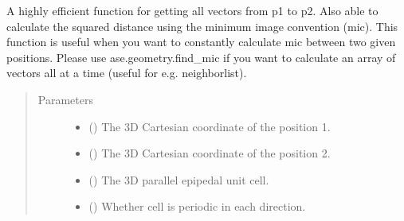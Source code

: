 \documentclass[letterpaper,10pt,english]{sphinxmanual}
\begin{document}
\begin{fulllineitems}
\label{\detokenize{utilities:acat.utilities.get_mic}}
A highly efficient function for getting all vectors from p1
to p2. Also able to calculate the squared distance using the
minimum image convention (mic). This function is useful when you
want to constantly calculate mic between two given positions.
Please use ase.geometry.find\_mic if you want to calculate an
array of vectors all at a time (useful for e.g. neighborlist).
\begin{quote}\begin{description}
\item[{Parameters}] \leavevmode\begin{itemize}
\item {} 
 () \textendash{} The 3D Cartesian coordinate of the position 1.

\item {} 
 () \textendash{} The 3D Cartesian coordinate of the position 2.

\item {} 
 () \textendash{} The 3D parallel epipedal unit cell.

\item {} 
 (\sphinxstyleliteralemphasis{\sphinxupquote{, }}\sphinxstyleliteralemphasis{\sphinxupquote{ {[}}}\sphinxstyleliteralemphasis{\sphinxupquote{, }}\sphinxstyleliteralemphasis{\sphinxupquote{, }}\sphinxstyleliteralemphasis{\sphinxupquote{{]}}}) \textendash{} Whether cell is periodic in each direction.


\end{itemize}
\end{description}
\end{quote}
\end{fulllineitems}
\end{document}
